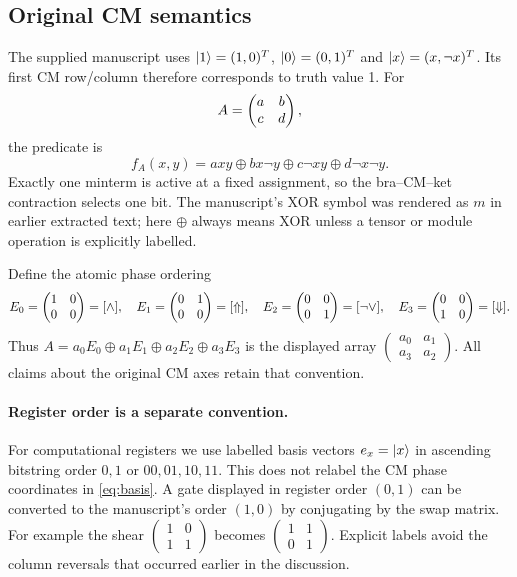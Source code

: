 \subsection{Original CM semantics}
The supplied manuscript uses $\lvert 1\rangle=(1,0)^T$, $\lvert 0\rangle=(0,1)^T$ and $\lvert x\rangle=(x,\neg x)^T$. Its first CM row/column therefore corresponds to truth value 1. For
\begin{equation}
 A=\begin{pmatrix}a&b\\c&d\end{pmatrix},
\end{equation}
the predicate is
\begin{equation}\label{eq:predicate}
 f_A(x,y)=a xy\oplus b x\neg y\oplus c\neg x y\oplus d\neg x\neg y.
\end{equation}
Exactly one minterm is active at a fixed assignment, so the bra--CM--ket contraction selects one bit. The manuscript's XOR symbol was rendered as $m$ in earlier extracted text; here $\oplus$ always means XOR unless a tensor or module operation is explicitly labelled.

Define the atomic phase ordering
\begin{equation}\label{eq:basis}
 E_0=\begin{pmatrix}1&0\\0&0\end{pmatrix}=[\wedge],\quad
 E_1=\begin{pmatrix}0&1\\0&0\end{pmatrix}=[\Uparrow],\quad
 E_2=\begin{pmatrix}0&0\\0&1\end{pmatrix}=[\neg\vee],\quad
 E_3=\begin{pmatrix}0&0\\1&0\end{pmatrix}=[\Downarrow].
\end{equation}
Thus $A=a_0E_0\oplus a_1E_1\oplus a_2E_2\oplus a_3E_3$ is the displayed array
$\left(\begin{smallmatrix}a_0&a_1\\a_3&a_2\end{smallmatrix}\right)$.
All claims about the original CM axes retain that convention.

\paragraph{Register order is a separate convention.}
For computational registers we use labelled basis vectors $e_x=\lvert x\rangle$ in ascending bitstring order $0,1$ or $00,01,10,11$. This does not relabel the CM phase coordinates in \cref{eq:basis}. A gate displayed in register order $(0,1)$ can be converted to the manuscript's order $(1,0)$ by conjugating by the swap matrix. For example the shear $\left(\begin{smallmatrix}1&0\\1&1\end{smallmatrix}\right)$ becomes $\left(\begin{smallmatrix}1&1\\0&1\end{smallmatrix}\right)$. Explicit labels avoid the column reversals that occurred earlier in the discussion.

